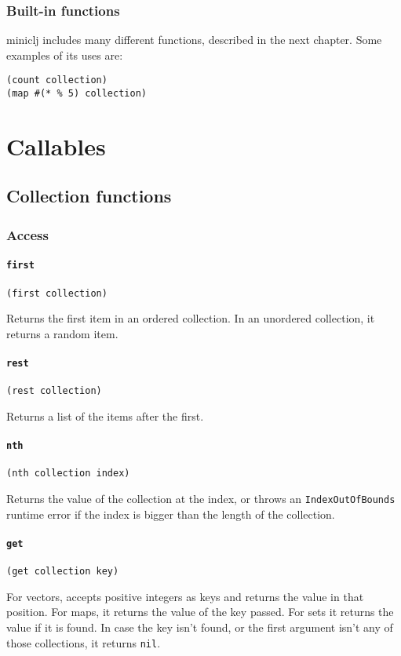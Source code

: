 \documentclass[11pt]{scrreprt}
\begin{document}
\subsection{Built-in functions}
miniclj includes many different functions, described in the next chapter. Some examples of its uses are:
\begin{verbatim}
(count collection)
(map #(* % 5) collection)
\end{verbatim}


\chapter{Callables}
\section{Collection functions}
\subsection{Access}
\subsubsection{\texttt{first}}
\begin{verbatim}
(first collection)
\end{verbatim}
Returns the first item in an ordered collection. In an unordered collection, it returns a random item.

\subsubsection{\texttt{rest}}
\begin{verbatim}
(rest collection)
\end{verbatim}
Returns a list of the items after the first.

\subsubsection{\texttt{nth}}
\begin{verbatim}
(nth collection index)
\end{verbatim}
Returns the value of the collection at the index, or throws an \texttt{IndexOutOfBounds} runtime error if the index is bigger than the length of the collection.

\subsubsection{\texttt{get}}
\begin{verbatim}
(get collection key)
\end{verbatim}
For vectors, accepts positive integers as keys and returns the value in that position. For maps, it returns the value of the key passed. For sets it returns the value if it is found. In case the key isn't found, or the first argument isn't any of those collections, it returns \texttt{nil}.
\end{document}
